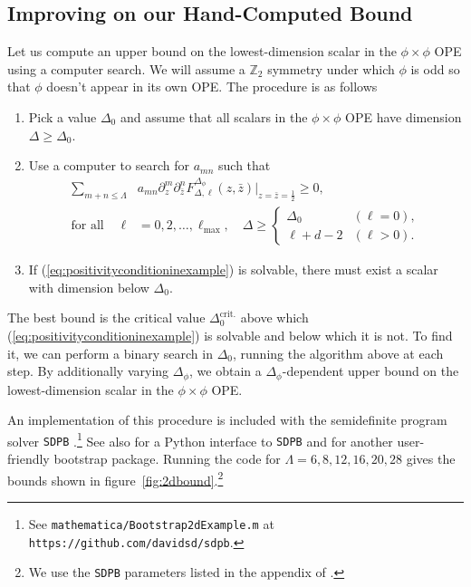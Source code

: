 \documentclass{ws-rv9x6}
\newcommand\f\phi
\newcommand\ptl\partial
\newcommand\<\langle
\renewcommand\>\rangle
\newcommand\Z{\mathbb{Z}}
\newcommand\nn{\nonumber}
\renewcommand\.{\cdot}
\newcommand\x\times
\newcommand\De{\Delta}
\begin{document}
\subsection{Improving on our Hand-Computed Bound}

Let us compute an upper bound on the lowest-dimension scalar in the $\f\x\f$ OPE using a computer search. We will assume a $\Z_2$ symmetry under which $\f$ is odd so that $\f$ doesn't appear in its own OPE\@. The procedure is as follows
\begin{enumerate}
\item Pick a value $\De_0$ and assume that all scalars in the $\f\x\f$ OPE have dimension $\De\geq \De_0$.

\item Use a computer to search for $a_{mn}$ such that
\begin{align}
\label{eq:positivityconditioninexample}
\sum_{m+n\leq \Lambda} & a_{mn}  \ptl_z^m\ptl_{\bar z}^n F^{\De_\f}_{\De,\ell}(z,\bar z)|_{z=\bar z = \frac 1 2} \geq 0,\nn\\
\textrm{for all }\quad\ell &= 0,2,\dots,\ell_\mathrm{max},\quad\De \geq \begin{cases}
\De_0 & (\ell=0), \\
\ell+d-2 & (\ell>0).
\end{cases}
\end{align}

\item If (\ref{eq:positivityconditioninexample}) is solvable, there must exist a scalar with dimension below $\De_0$.

\end{enumerate}

The best bound is the critical value $\De_{0}^\mathrm{crit.}$ above which (\ref{eq:positivityconditioninexample}) is solvable and below which it is not. To find it, we can perform a binary search in $\De_0$, running the algorithm above at each step. By additionally varying $\De_\f$, we obtain a $\De_\f$-dependent upper bound on the lowest-dimension scalar in the $\f\x\f$ OPE.

An implementation of this procedure is included with the semidefinite program solver {\tt SDPB} \cite{Simmons-Duffin:2015qma}.\footnote{See {\tt mathematica/Bootstrap2dExample.m} at {\tt https://github.com/davidsd/sdpb}.}  See also \cite{Behan:2016dtz} for a Python interface to {\tt SDPB} and \cite{Paulos:2014vya} for another user-friendly bootstrap package.  Running the code for $\Lambda=6,8,12,16,20,28$ gives the bounds shown in figure~\ref{fig:2dbound}.\footnote{We use the {\tt SDPB} parameters listed in the appendix of \cite{Simmons-Duffin:2015qma}.}  
\end{document}
